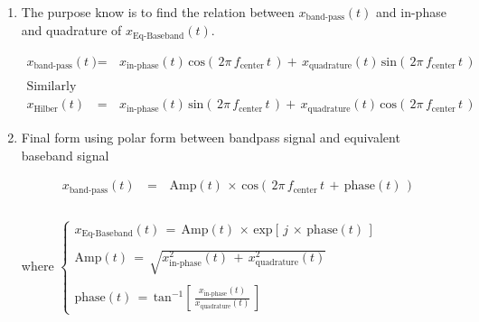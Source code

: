 \documentclass[12pt,a4paper]{book}
\begin{document}
\begin{enumerate}
\item  The purpose know is to find the relation between $x_{\text{band-pass}}(t)$ and in-phase and quadrature of $x_{\text{Eq-Baseband}}(t)$.

\begin{equation}
\begin{array}{rcl}
x_{\text{band-pass}}(t) \, &=& \, x_{\text{in-phase}}(t) \, \text{cos}\left(\, 2 \pi \, f_{\text{center}} \, t \,\right) + \, x_{\text{quadrature}}(t) \, \text{sin}\left(\, 2 \pi \, f_{\text{center}} \, t \,\right) \\ \\

\text{Similarly but less important} \\ 
x_{\text{Hilber}}(t) \, &=& \, x_{\text{in-phase}}(t) \, \text{sin}\left(\, 2 \pi \, f_{\text{center}} \, t \,\right) + \, x_{\text{quadrature}}(t) \, \text{cos}\left(\, 2 \pi \, f_{\text{center}} \, t \,\right) 
\end{array}
\end{equation}


\item Final form using polar form between bandpass signal and equivalent baseband signal

\begin{equation}
\begin{array}{rcl}
x_{\text{band-pass}}(t) \, &=&\, \text{Amp}(t) \, \times \, \text{cos}\left(\, 2 \pi \, f_{\text{center}} \, t \, + \, \text{phase}(t) \,\right)\\ \\
\end{array}
\label{Eq:Sampling:based_band_general_form_time_domain}
\end{equation}

where $\begin{cases}
x_{\text{Eq-Baseband}}(t) \, = \, \text{Amp}(t)\,\times \, \text{exp}\left[\, j \,\times \, \text{phase}(t) \,\right] \\ \\
\text{Amp}(t) \, = \, \sqrt{ x_{\text{in-phase}}^2(t) \, + \, x_{\text{quadrature}}^2(t)} \\ \\
\text{phase}(t) \,  = \, \text{tan}^{-1}\left[\, \displaystyle\frac{x_{\text{in-phase}}(t)}{x_{\text{quadrature}}(t)} \,\right] 
\end{cases}$

	\begin{itemize}
	

\end{itemize}
\end{enumerate}
\end{document}
